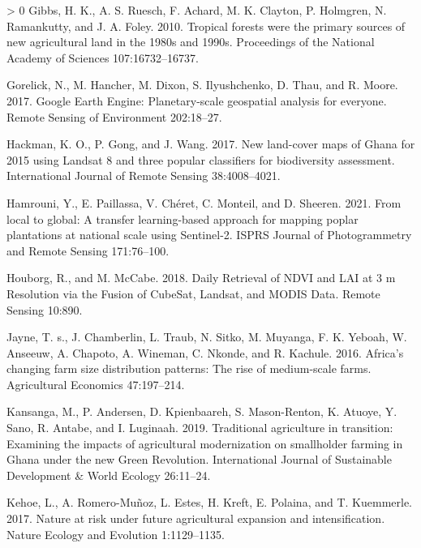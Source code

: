 \documentclass[11pt,a4paper]{article}
\newlength{\cslhangindent}
\newenvironment{CSLReferences}[3] %
 {%
  \setlength{\parindent}{0pt}
  \ifodd #1 \everypar{\setlength{\hangindent}{\cslhangindent}}\ignorespaces\fi
  \ifnum #2 > 0
  \setlength{\parskip}{#2\baselineskip}
  \fi
 }%
 {}
\begin{document}
\begin{CSLReferences}{1}{0}
\leavevmode\hypertarget{ref-GibbsTropicalforestswere2010}{}%
Gibbs, H. K., A. S. Ruesch, F. Achard, M. K. Clayton, P. Holmgren, N.
Ramankutty, and J. A. Foley. 2010. Tropical forests were the primary
sources of new agricultural land in the 1980s and 1990s. Proceedings of
the National Academy of Sciences 107:16732--16737.

\leavevmode\hypertarget{ref-GorelickGoogleEarthEngine2017}{}%
Gorelick, N., M. Hancher, M. Dixon, S. Ilyushchenko, D. Thau, and R.
Moore. 2017. Google {Earth Engine}: {Planetary}-scale geospatial
analysis for everyone. Remote Sensing of Environment 202:18--27.

\leavevmode\hypertarget{ref-hackmanNewLandcoverMaps2017}{}%
Hackman, K. O., P. Gong, and J. Wang. 2017. New land-cover maps of
{Ghana} for 2015 using {Landsat} 8 and three popular classifiers for
biodiversity assessment. International Journal of Remote Sensing
38:4008--4021.

\leavevmode\hypertarget{ref-hamrouniLocalGlobalTransfer2021}{}%
Hamrouni, Y., E. Paillassa, V. Chéret, C. Monteil, and D. Sheeren. 2021.
From local to global: {A} transfer learning-based approach for mapping
poplar plantations at national scale using {Sentinel}-2. ISPRS Journal
of Photogrammetry and Remote Sensing 171:76--100.

\leavevmode\hypertarget{ref-HouborgDailyRetrievalNDVI2018}{}%
Houborg, R., and M. McCabe. 2018. Daily {Retrieval} of {NDVI} and {LAI}
at 3 m {Resolution} via the {Fusion} of {CubeSat}, {Landsat}, and {MODIS
Data}. Remote Sensing 10:890.

\leavevmode\hypertarget{ref-jayneAfricaChangingFarm2016}{}%
Jayne, T. s., J. Chamberlin, L. Traub, N. Sitko, M. Muyanga, F. K.
Yeboah, W. Anseeuw, A. Chapoto, A. Wineman, C. Nkonde, and R. Kachule.
2016. Africa's changing farm size distribution patterns: The rise of
medium-scale farms. Agricultural Economics 47:197--214.

\leavevmode\hypertarget{ref-KansangaTraditionalagriculturetransition2019}{}%
Kansanga, M., P. Andersen, D. Kpienbaareh, S. Mason-Renton, K. Atuoye,
Y. Sano, R. Antabe, and I. Luginaah. 2019. Traditional agriculture in
transition: Examining the impacts of agricultural modernization on
smallholder farming in {Ghana} under the new {Green Revolution}.
International Journal of Sustainable Development \& World Ecology
26:11--24.

\leavevmode\hypertarget{ref-kehoeNatureRiskFuture2017}{}%
Kehoe, L., A. Romero-Muñoz, L. Estes, H. Kreft, E. Polaina, and T.
Kuemmerle. 2017. Nature at risk under future agricultural expansion and
intensification. Nature Ecology and Evolution 1:1129--1135.


\end{CSLReferences}
\end{document}

